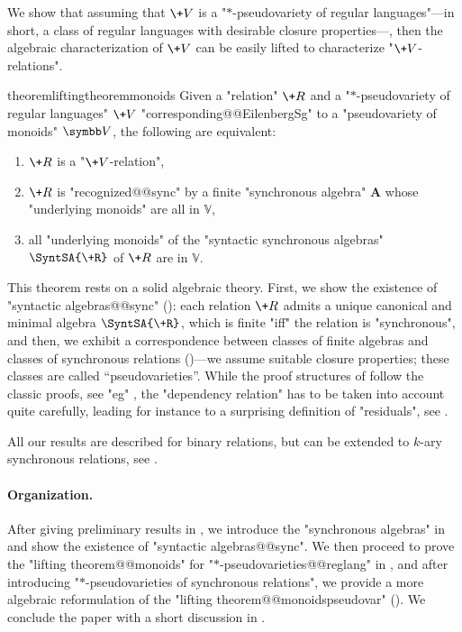 We show that assuming that $\+V$ is a "$*$-pseudovariety of regular languages"---in short, a class of regular languages with desirable closure properties---, then the algebraic characterization of $\+V$ can be easily lifted to characterize "$\+V$-relations".

\begin{restatable*}{theorem}{liftingtheoremmonoids}
	\AP\label{thm:lifting-theorem-monoids}
	Given a "relation" $\+R$ and a "$\ast$-pseudovariety of regular languages" $\+V$
	"corresponding@@EilenbergSg" to a "pseudovariety of monoids" $\B{V}$,
	the following are equivalent:
	\begin{enumerate}
		\item $\+R$ is a "$\+V$-relation",
		\item $\+R$ is "recognized@@sync" by a finite "synchronous algebra" $\mathbf{A}$
			whose "underlying monoids" are all in $\mathbb{V}$,
		\item all "underlying monoids" of the "syntactic synchronous algebras" $\SyntSA{\+R}$ of
			$\+R$ are in $\mathbb{V}$.
	\end{enumerate} 
\end{restatable*}

This theorem rests on a solid algebraic theory. 
First, we show the existence of "syntactic algebras@@sync" (): 
each relation $\+R$ admits a unique canonical and minimal algebra $\SyntSA{\+R}$, which is finite 
"iff" the relation is "synchronous",
and then, we exhibit a correspondence between classes of finite algebras and classes of
synchronous relations ()---we assume suitable closure properties; these classes are called ``pseudovarieties''.
While the proof structures of  follow the classic proofs, see "eg" \cite{pin_mathematical_2022},
the "dependency relation" has to be taken into account quite carefully, leading for instance
to a surprising definition of "residuals", see .

\begin{remark}
	All our results are described for binary relations, but can be extended to
	$k$-ary synchronous relations, see .
\end{remark}

\paragraph*{Organization.} After giving preliminary results in , we introduce
the "synchronous algebras" in  and show the existence of
"syntactic algebras@@sync". We then proceed to prove the "lifting theorem@@monoids" for 
"$*$-pseudovarieties@@reglang" in , and after introducing "$*$-pseudovarieties of synchronous relations", we provide a more algebraic reformulation of the "lifting 
theorem@@monoidspseudovar" ().
We conclude the paper with
a short discussion in .

